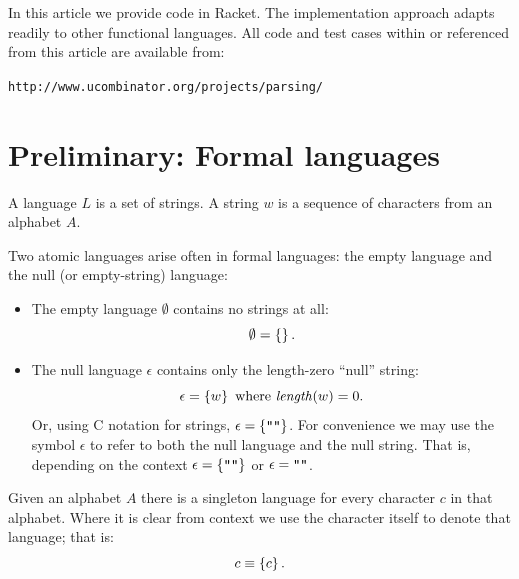 %
In this article we provide code in Racket. The implementation approach adapts
readily to other functional languages.
%
All code and test cases within or referenced from this article
are available from: \begin{center}
\texttt{http://www.ucombinator.org/projects/parsing/} \end{center}



\section{Preliminary: Formal languages}

A language $L$ is a set of strings.
%
A string $w$ is a sequence of characters from an alphabet $A$.
%
%


Two atomic languages arise often in formal languages: the empty language and
the null (or empty-string) language:
%
\begin{itemize}
\item
The empty language $\emptyset$ contains no strings at all:
\begin{equation*}
 \emptyset = \left\{\right\}
 \text.
\end{equation*}

\item
The null language $\epsilon$ contains only the length-zero ``null'' string:
\begin{equation*}
 \epsilon = \left\{ w \right\} \text{ where } \mathit{length}(w) = 0
 \text.
\end{equation*}
%
Or, using C notation for strings, $\epsilon = \left\{\mbox{\tt ""}\right\}$.
%
For convenience we may use the symbol $\epsilon$ to refer to both the null language and the null string. 
%
That is, depending on the context $\epsilon = \left\{\mbox{\tt ""}\right\}$ or $\epsilon = \mbox{\tt ""}$.

\end{itemize}
%
Given an alphabet $A$ there is a singleton language for every character $c$ in that alphabet.
%
Where it is clear from context we use the character itself to denote that language; that is:
\begin{equation*}
 c \equiv \left\{ c \right\}
 \text.
\end{equation*}


